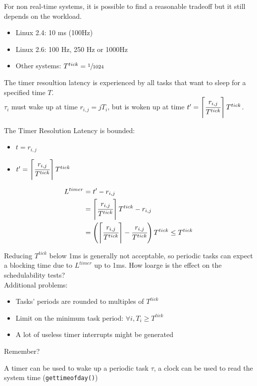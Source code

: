 For non real-time systems, it is possible to find a reasonable tradeoff but it still depends on the workload.
{
    \begin{itemize}
        \item Linux 2.4: 10 ms (100Hz)
        \item Linux 2.6: 100 Hz, 250 Hz or 1000Hz
        \item Other systems: $T^{tick} = \sfrac{1}{1024}$
    \end{itemize}
}
The timer resoultion latency is experienced by all tasks that want to sleep for a specified time $T$.\\
$\tau_i$ must wake up at time $r_{i,j} = j T_i$, but is woken up at time $t' = \left\lceil \cfrac{r_{i,j}}{T^{tick}} \right\rceil T^{tick}$.

The Timer Resolution Latency is bounded:
\begin{itemize}
    \item $t = r_{i,j}$
    \item $t' = \left\lceil \cfrac{r_{i,j}}{T^{tick}} \right\rceil T^{tick}$
\end{itemize}
\begin{align*}
    L^{timer} &= t' - r_{i,j}\\
&= \left\lceil \cfrac{r_{i,j}}{T^{tick}} \right\rceil T^{tick}- r_{i,j}\\
&= \left(\left\lceil \cfrac{r_{i,j}}{T^{tick}} \right\rceil - \cfrac{r_{i,j}}{T^{tick}}\right) T^{tick} \le T^{tick}
\end{align*}

Reducing $T^{tick}$ below 1ms is generally not acceptable, so periodic tasks can expect a blocking time due to $L^{timer}$ up to 1ms.
How loarge is the effect on the schedulability tests?\\
Additional problems:
\begin{itemize}
    \item Tasks' periods are rounded to multiples of $T^{tick}$
    \item Limit on the minimum task period: $\forall i, T_{i}\ge T^{tick}$
    \item A lot of useless timer interrupts might be generated
\end{itemize}

Remember?

A timer can be used to wake up a periodic task $\tau$, a clock can be used to read the system time (\texttt{gettimeofday()})

